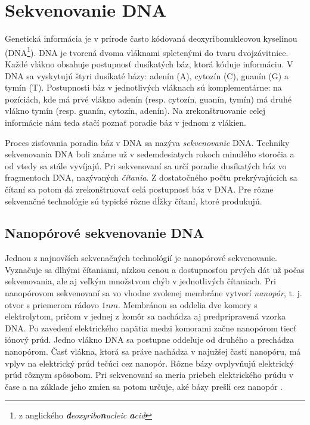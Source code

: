 \chapter{Sekvenovanie DNA}

\label{kap:sekvenovanie}

Genetická informácia je v prírode často kódovaná deoxyribonukleovou kyselinou (DNA\footnote{z anglického 
\emph{\textbf{d}eoxyribo\textbf{n}ucleic \textbf{a}cid}}). DNA je tvorená dvoma vláknami spletenými
do tvaru dvojzávitnice. Každé vlákno obsahuje postupnosť dusíkatých báz, ktorá kóduje informáciu. V DNA 
sa 
vyskytujú štyri
dusíkaté bázy: adenín (A), cytozín (C), guanín (G) a tymín (T). Postupnosti báz v jednotlivých vláknach 
sú 
komplementárne: na pozíciách, kde má prvé vlákno adenín 
(resp. cytozín, guanín, tymín) má druhé vlákno tymín (resp. guanín, cytozín, adenín). Na 
zrekonštruovanie 
celej informácie nám teda stačí poznať poradie báz v jednom z vlákien.

Proces zisťovania poradia báz v DNA sa nazýva \emph{sekvenovanie} DNA. Techniky sekvenovania DNA
boli známe už v sedemdesiatych rokoch minulého storočia a od vtedy sa stále vyvíjajú. Pri sekvenovaní
sa určí poradie dusíkatých báz vo fragmentoch DNA, nazývaných \emph{čítania}. Z dostatočného počtu 
prekrývajúcich sa čítaní sa potom dá zrekonštruovať celá postupnosť báz v DNA. Pre rôzne sekvenačné 
technológie sú typické rôzne dĺžky čítaní, ktoré produkujú.

\section{Nanopórové sekvenovanie DNA}

Jednou z najnovších sekvenačných technológií je nanopórové sekvenovanie. Vyznačuje sa dlhými čítaniami,
nízkou cenou a dostupnosťou prvých dát už počas sekvenovania, ale aj veľkým množstvom chýb v 
jednotlivých čítaniach. Pri nanopórovom sekvenovaní sa vo vhodne zvolenej membráne vytvorí 
\emph{nanopór}, t. j. otvor s priemerom rádovo $1 \si{nm}$. Membránou sa oddelia dve komory s 
elektrolytom, pričom v jednej z komôr sa nachádza aj predpripravená vzorka DNA.
Po zavedení elektrického napätia medzi komorami začne nanopórom tiecť iónový prúd. Jedno vlákno DNA sa postupne oddeľuje od druhého a prechádza nanopórom. Časť vlákna, 
ktorá sa práve nachádza v najužšej časti nanopóru, má vplyv na elektrický prúd tečúci cez nanopór. Rôzne 
bázy ovplyvňujú elektrický prúd rôznym spôsobom. Pri sekvenovaní sa meria priebeh elektrického prúdu v 
čase a na základe jeho zmien sa potom určuje, aké bázy prešli cez nanopór \cite{Branton2008}.


